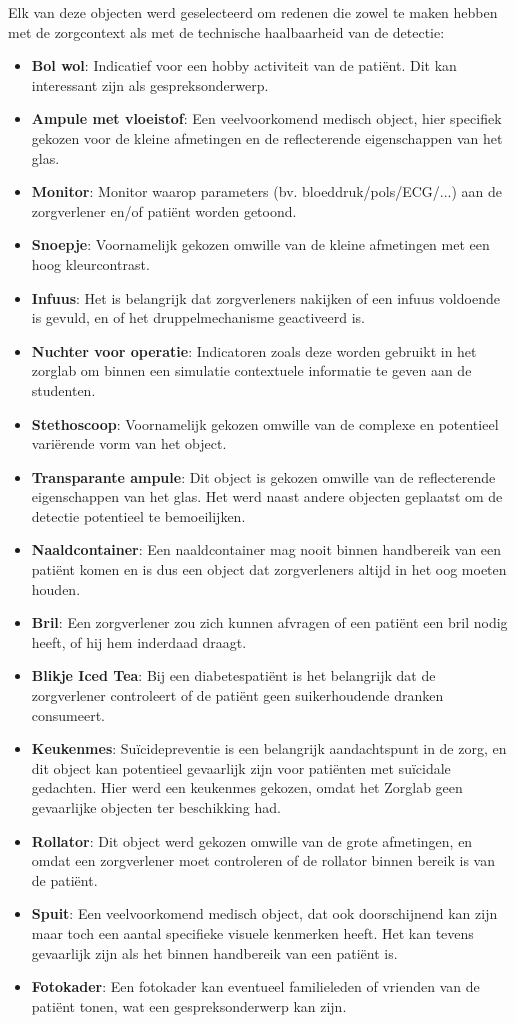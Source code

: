 Elk van deze objecten werd geselecteerd om redenen die zowel te maken hebben met de zorgcontext als met de technische haalbaarheid van de detectie:
\begin{itemize}
  \item \textbf{Bol wol}: Indicatief voor een hobby activiteit van de patiënt. Dit kan interessant zijn als gespreksonderwerp.
  \item \textbf{Ampule met vloeistof}: Een veelvoorkomend medisch object, hier specifiek gekozen voor de kleine afmetingen en de reflecterende eigenschappen van het glas.
  \item \textbf{Monitor}: Monitor waarop parameters (bv. bloeddruk/pols/ECG/...) aan de zorgverlener en/of patiënt worden getoond.
  \item \textbf{Snoepje}: Voornamelijk gekozen omwille van de kleine afmetingen met een hoog kleurcontrast.
  \item \textbf{Infuus}: Het is belangrijk dat zorgverleners nakijken of een infuus voldoende is gevuld, en of het druppelmechanisme geactiveerd is.
  \item \textbf{Nuchter voor operatie}: Indicatoren zoals deze worden gebruikt in het zorglab om binnen een simulatie contextuele informatie te geven aan de studenten.
  \item \textbf{Stethoscoop}: Voornamelijk gekozen omwille van de complexe en potentieel variërende vorm van het object.
  \item \textbf{Transparante ampule}: Dit object is gekozen omwille van de reflecterende eigenschappen van het glas. Het werd naast andere objecten geplaatst om de detectie potentieel te bemoeilijken.
  \item \textbf{Naaldcontainer}: Een naaldcontainer mag nooit binnen handbereik van een patiënt komen en is dus een object dat zorgverleners altijd in het oog moeten houden.
  \item \textbf{Bril}: Een zorgverlener zou zich kunnen afvragen of een patiënt een bril nodig heeft, of hij hem inderdaad draagt.
  \item \textbf{Blikje Iced Tea}: Bij een diabetespatiënt is het belangrijk dat de zorgverlener controleert of de patiënt geen suikerhoudende dranken consumeert.
  \item \textbf{Keukenmes}: Suïcidepreventie is een belangrijk aandachtspunt in de zorg, en dit object kan potentieel gevaarlijk zijn voor patiënten met suïcidale gedachten. Hier werd een keukenmes gekozen, omdat het Zorglab geen gevaarlijke objecten ter beschikking had.
  \item \textbf{Rollator}: Dit object werd gekozen omwille van de grote afmetingen, en omdat een zorgverlener moet controleren of de rollator binnen bereik is van de patiënt.
  \item \textbf{Spuit}: Een veelvoorkomend medisch object, dat ook doorschijnend kan zijn maar toch een aantal specifieke visuele kenmerken heeft. Het kan tevens gevaarlijk zijn als het binnen handbereik van een patiënt is.
  \item \textbf{Fotokader}: Een fotokader kan eventueel familieleden of vrienden van de patiënt tonen, wat een gespreksonderwerp kan zijn.
\end{itemize}

